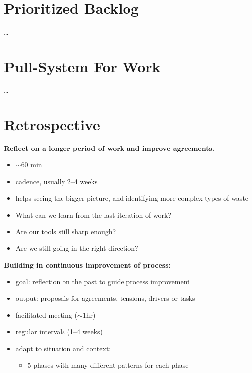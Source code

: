 \section{Prioritized Backlog}
\label{prioritizedbacklog}

{\ldots}

\section{Pull-System For Work}
\label{pull-systemforwork}

{\ldots}

\section{Retrospective}
\label{retrospective}

\textbf{Reflect on a longer period of work and improve agreements.}

\begin{itemize}
\item \ensuremath{\sim}60 min

\item cadence, usually 2--4 weeks

\item helps seeing the bigger picture, and identifying more complex types of waste

\item What can we learn from the last iteration of work?

\item Are our tools still sharp enough?

\item Are we still going in the right direction?

\end{itemize}

\textbf{Building in continuous improvement of process:}

\begin{itemize}
\item goal: reflection on the past to guide process improvement

\item output: proposals for agreements, tensions, drivers or tasks

\item facilitated meeting (\ensuremath{\sim}1hr)

\item regular intervals (1--4 weeks)

\item adapt to situation and context:

\begin{itemize}
\item 5 phases with many different patterns for each phase

\end{itemize}

\end{itemize}

